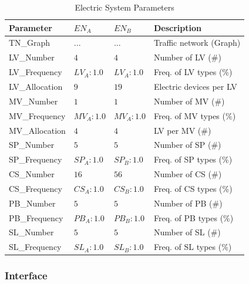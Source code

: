 \begin{table}[h]
	\renewcommand{\arraystretch}{1.3}
	\caption{Electric System Parameters}
	\centering
	\begin{tabular}{llll}
		\hline
		\textbf{Parameter}     & \textbf{$EN_{A}$} & \textbf{$EN_{B}$}       & \textbf{Description} \\ \hline
		TN\_Graph              & $...$ & $...$    	  & Traffic network (Graph)     \\
		LV\_Number             & $4$ & $4$            & Number of LV (\#)      \\
		LV\_Frequency          & $LV_{A}:1.0$ & $LV_{A}:1.0$                & Freq. of LV types (\%)      \\
		LV\_Allocation         & $9$ & $19$                 & Electric devices per LV      \\   
		MV\_Number             & $1$ & $1$        & Number of MV (\#)      \\ 
		MV\_Frequency          & $MV_{A}:1.0$ & $MV_{A}:1.0$                & Freq. of MV types (\%)      \\
		MV\_Allocation         & $4$ & $4$                     & LV per MV (\#)      \\   
		SP\_Number             & $5$ & $5$         & Number of SP (\#)      \\ 
		SP\_Frequency          & $SP_{A}:1.0$ & $SP_{B}:1.0$                & Freq. of SP types (\%)       \\  
		CS\_Number             & $16$  & $56$           & Number of CS (\#)      \\
		CS\_Frequency          & $CS_{A}:1.0$  & $CS_{B}:1.0$               & Freq. of CS types (\%)       \\   
		PB\_Number          & $5$  & $5$              & Number of PB (\#)      \\
		PB\_Frequency          & $PB_{A}:1.0$ & $PB_{B}:1.0$              & Freq. of PB types (\%)       \\ 
		SL\_Number          & $5$ & $5$              & Number of SL (\#)      \\
		SL\_Frequency          & $SL_{A}:1.0$ & $SL_{B}:1.0$              & Freq. of SL types (\%)       \\  \hline  
	\end{tabular}
\end{table}

\subsubsection{Interface}

